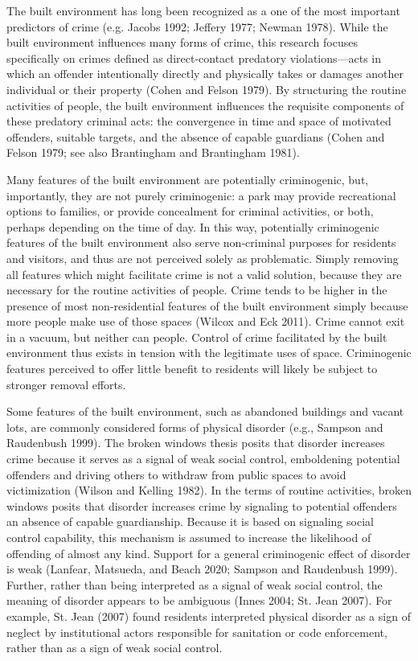 \documentclass [11pt, proquest] {uwthesis}[2015/03/03]
\begin{document}
The built environment has long been recognized as a one of the most important predictors of crime (e.g. Jacobs 1992; Jeffery 1977; Newman 1978). While the built environment influences many forms of crime, this research focuses specifically on crimes defined as direct-contact predatory violations---acts in which an offender intentionally directly and physically takes or damages another individual or their property (Cohen and Felson 1979). By structuring the routine activities of people, the built environment influences the requisite components of these predatory criminal acts: the convergence in time and space of motivated offenders, suitable targets, and the absence of capable guardians (Cohen and Felson 1979; see also Brantingham and Brantingham 1981).

Many features of the built environment are potentially criminogenic, but, importantly, they are not purely criminogenic: a park may provide recreational options to families, or provide concealment for criminal activities, or both, perhaps depending on the time of day. In this way, potentially criminogenic features of the built environment also serve non-criminal purposes for residents and visitors, and thus are not perceived solely as problematic. Simply removing all features which might facilitate crime is not a valid solution, because they are necessary for the routine activities of people. Crime tends to be higher in the presence of most non-residential features of the built environment simply because more people make use of those spaces (Wilcox and Eck 2011). Crime cannot exit in a vacuum, but neither can people. Control of crime facilitated by the built environment thus exists in tension with the legitimate uses of space. Criminogenic features perceived to offer little benefit to residents will likely be subject to stronger removal efforts.

Some features of the built environment, such as abandoned buildings and vacant lots, are commonly considered forms of physical disorder (e.g., Sampson and Raudenbush 1999). The broken windows thesis posits that disorder increases crime because it serves as a signal of weak social control, emboldening potential offenders and driving others to withdraw from public spaces to avoid victimization (Wilson and Kelling 1982). In the terms of routine activities, broken windows posits that disorder increases crime by signaling to potential offenders an absence of capable guardianship. Because it is based on signaling social control capability, this mechanism is assumed to increase the likelihood of offending of almost any kind. Support for a general criminogenic effect of disorder is weak (Lanfear, Matsueda, and Beach 2020; Sampson and Raudenbush 1999). Further, rather than being interpreted as a signal of weak social control, the meaning of disorder appears to be ambiguous (Innes 2004; St. Jean 2007). For example, St. Jean (2007) found residents interpreted physical disorder as a sign of neglect by institutional actors responsible for sanitation or code enforcement, rather than as a sign of weak social control.
\end{document}
